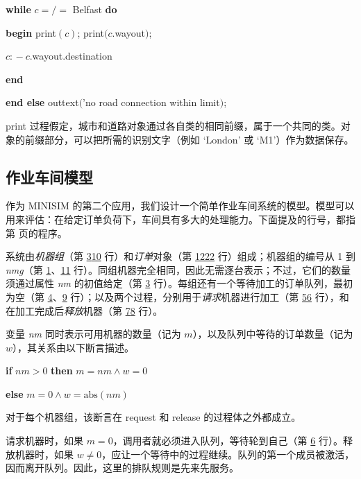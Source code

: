 \documentclass[twoside,11pt,fontset=none]{ctexbook}
\begin{document}
\quad \quad \textbf{while} $c =/=$ Belfast \textbf{do}

\quad \quad \textbf{begin} print$(c)$; print$(c$.wayout$)$;

\quad \quad \quad $c$: $-\ c$.wayout.destination

\quad \quad \textbf{end}

\quad \textbf{end else} outtext$($'no road connection within limit$)$;

\noindent
print 过程假定，城市和道路对象通过各自类的相同前缀，属于一个共同的类。对象的前缀部分，可以把所需的识别文字（例如 `London' 或 `M1'）作为数据保存。

\subsection{作业车间模型}

作为 MINISIM 的第二个应用，我们设计一个简单作业车间系统的模型。模型可以用来评估：在给定订单负荷下，车间具有多大的处理能力。下面提及的行号，都指第 \pageref{pg:program-job-shop} 页的程序。

系统由\textit{机器组}（第 \hyperref[pg:program-job-shop-3]{3}\textendash \hyperref[pg:program-job-shop-10]{10} 行）和\textit{订单}对象（第 \hyperref[pg:program-job-shop-12]{12}\textendash \hyperref[pg:program-job-shop-22]{22} 行）组成；机器组的编号从 1 到 \textit{nmg}（第 \hyperref[pg:program-job-shop-1]{1}、\hyperref[pg:program-job-shop-11]{11} 行）。同组机器完全相同，因此无需逐台表示；不过，它们的数量须通过属性 \textit{nm} 的初值给定（第 \hyperref[pg:program-job-shop-3]{3} 行）。每组还有一个等待加工的订单队列，最初为空（第 \hyperref[pg:program-job-shop-4]{4}、\hyperref[pg:program-job-shop-9]{9} 行）；以及两个过程，分别用于\textit{请求}机器进行加工（第 \hyperref[pg:program-job-shop-5]{5}\textendash \hyperref[pg:program-job-shop-6]{6} 行），和在加工完成后\textit{释放}机器（第 \hyperref[pg:program-job-shop-7]{7}\textendash \hyperref[pg:program-job-shop-8]{8} 行）。

变量 \textit{nm} 同时表示可用机器的数量（记为 $m$），以及队列中等待的订单数量（记为 $w$），其关系由以下断言描述。

\quad \textbf{if} $nm > 0$ \textbf{then} $m = nm \land w = 0$

\quad \textbf{else} $m = 0 \land w = \text{abs}(nm)$

\noindent
对于每个机器组，该断言在 request 和 release 的过程体之外都成立。

请求机器时，如果 $m = 0$，调用者就必须进入队列，等待轮到自己（第 \hyperref[pg:program-job-shop-6]{6} 行）。释放机器时，如果 $w \neq 0$，应让一个等待中的过程继续。队列的第一个成员被激活，因而离开队列。因此，这里的排队规则是先来先服务。
\end{document}
